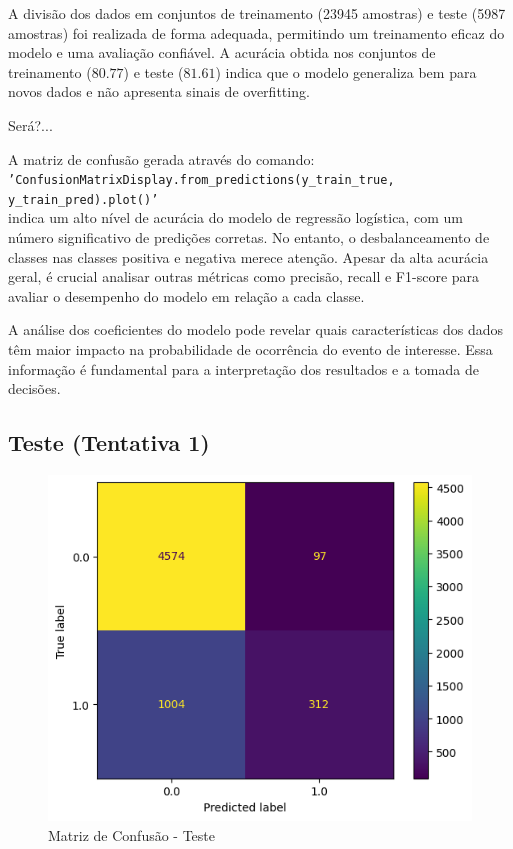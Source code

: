 \documentclass{abntpuc}
\begin{document}
A divisão dos dados em conjuntos de treinamento (23945 amostras) e teste (5987 amostras) foi realizada de forma adequada, permitindo um treinamento eficaz do modelo e uma avaliação confiável. A acurácia obtida nos conjuntos de treinamento ($ 80.77 $) e teste ($ 81.61 $) indica que o modelo generaliza bem para novos dados e não apresenta sinais de overfitting.

Será?...

A matriz de confusão gerada através do comando:\\ \texttt{'ConfusionMatrixDisplay.from\_predictions(y\_train\_true, y\_train\_pred).plot()'}\\indica um alto nível de acurácia do modelo de regressão logística, com um número significativo de predições corretas. No entanto, o desbalanceamento de classes nas classes positiva e negativa merece atenção. Apesar da alta acurácia geral, é crucial analisar outras métricas como precisão, recall e F1-score para avaliar o desempenho do modelo em relação a cada classe.

A análise dos coeficientes do modelo pode revelar quais características dos dados têm maior impacto na probabilidade de ocorrência do evento de interesse. Essa informação é fundamental para a interpretação dos resultados e a tomada de decisões.

\subsection*{\centering\large\textbf{Teste (Tentativa 1)}}
\begin{figure}[H]
    \centering
    \includegraphics[width=\textwidth]{grafico6.png}
    \caption{Matriz de Confusão - Teste}
    \label{fig:grafico6}
    \centering
\end{figure}
\end{document}
